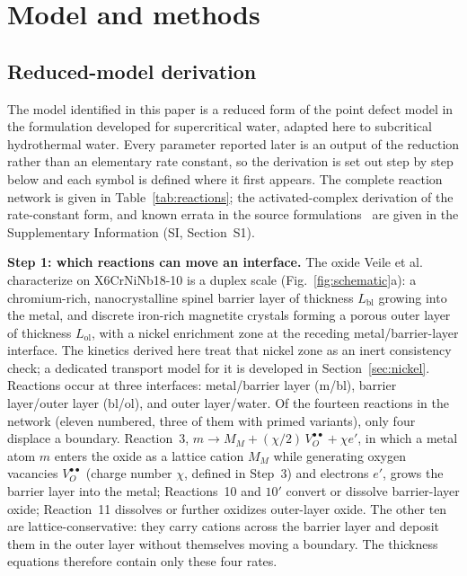 \documentclass[a4paper,fleqn]{cas-sc}
\begin{document}
\section{Model and methods}\label{sec:methods}

\subsection{Reduced-model derivation}\label{sec:model-methods}

The model identified in this paper is a reduced form of the point defect
model in the formulation \citet{li2020scwpdm} developed for
supercritical water, adapted here to subcritical hydrothermal water.
Every parameter reported later is an output of the reduction rather than
an elementary rate constant, so the derivation is set out step by step
below and each symbol is defined where it first appears. The complete reaction network is given in
Table~\ref{tab:reactions}; the activated-complex derivation of the rate-constant
form, and known errata in the source
formulations~\citep{li2020scwpdm} are given in the Supplementary
Information (SI, Section~S1).

\textbf{Step 1: which reactions can move an interface.} The oxide Veile
et al.~\citep{veile2024} characterize on X6CrNiNb18-10 is a duplex scale
(Fig.~\ref{fig:schematic}a): a chromium-rich, nanocrystalline spinel
barrier layer of thickness $L_\text{bl}$ growing into the metal, and
discrete iron-rich magnetite crystals forming a porous outer layer of
thickness $L_\text{ol}$, with a nickel enrichment zone at the receding
metal/barrier-layer interface. The kinetics derived here treat that
nickel zone as an inert consistency check; a dedicated transport model
for it is developed in Section~\ref{sec:nickel}. Reactions occur at
three interfaces: metal/barrier layer (m/bl), barrier layer/outer layer
(bl/ol), and outer layer/water. Of the fourteen reactions in the network
(eleven numbered, three of them with primed variants), only four
displace a boundary. Reaction~3, $m \rightarrow M_M +
(\chi/2)\,V_O^{\bullet\bullet} + \chi e'$, in which a metal atom $m$
enters the oxide as a lattice cation $M_M$ while generating oxygen
vacancies $V_O^{\bullet\bullet}$ (charge number $\chi$, defined in
Step~3) and electrons $e'$, grows the barrier layer into the metal;
Reactions~10 and $10'$ convert or dissolve barrier-layer oxide;
Reaction~11 dissolves or further oxidizes outer-layer oxide. The other
ten are lattice-conservative: they carry cations across the barrier
layer and deposit them in the outer layer without themselves moving a
boundary. The thickness equations therefore contain only these four
rates.
\end{document}
